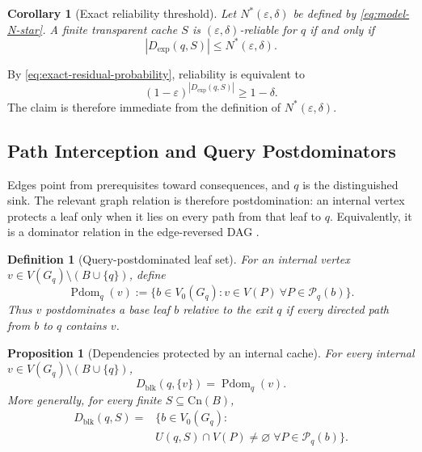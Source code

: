 \documentclass[journal]{IEEEtran}
\makeatletter
\newcommand{\Cn}{\text{Cn}}
\newtheorem{proposition}{Proposition}[section]
\newtheorem{corollary}{Corollary}[section]
\newtheorem{definition}{Definition}[section]
\numberwithin{equation}{section}
\renewenvironment{proof}[1][\proofname]{\par
  \pushQED{\qed}%
  \normalfont \topsep6\p@\@plus6\p@\relax
  \trivlist
  \item[\hskip\labelsep
        \itshape
    #1\@addpunct{.}]\ignorespaces
}{%
  \popQED\endtrivlist\@endpefalse
}
\makeatother
\begin{document}
\begin{corollary}[Exact reliability threshold]
\label{cor:exact-reliability-threshold}
Let \(N^*(\varepsilon,\delta)\) be defined by
\eqref{eq:model-N-star}.  A finite transparent cache \(S\) is
\((\varepsilon,\delta)\)-reliable for \(q\) if and only if
\begin{equation}
  |D_{\mathrm{exp}}(q,S)|
  \le
  N^*(\varepsilon,\delta).
\label{eq:exact-reliability-threshold}
\end{equation}
\end{corollary}

\begin{proof}
By \eqref{eq:exact-residual-probability}, reliability is equivalent to
\[
  (1-\varepsilon)^{|D_{\mathrm{exp}}(q,S)|}\ge 1-\delta.
\]
The claim is therefore immediate from the definition of
\(N^*(\varepsilon,\delta)\).
\end{proof}

\subsection{Path Interception and Query Postdominators}
\label{subsec:postdominator-interpretation}

Edges point from prerequisites toward consequences, and \(q\) is the
distinguished sink.  The relevant graph relation is therefore postdomination:
an internal vertex protects a leaf only when it lies on every path from that
leaf to \(q\).  Equivalently, it is a dominator relation in the
edge-reversed DAG \cite{lengauer1979fast}.

\begin{definition}[Query-postdominated leaf set]
\label{def:query-postdominator}
For an internal vertex
\(v\in V(G_q)\setminus(B\cup\{q\})\), define
\begin{equation}
  \operatorname{Pdom}_q(v)
  \!:=\!
  \bigl\{
    b\in V_0(G_q):
    v\in V(P)\ \forall P\in\mathcal P_q(b)
  \bigr\}.
\label{eq:def-query-postdominator}
\end{equation}
Thus \(v\) postdominates a base leaf \(b\) relative to the exit \(q\) if every
directed path from \(b\) to \(q\) contains \(v\).
\end{definition}

\begin{proposition}[Dependencies protected by an internal cache]
\label{prop:postdominator-protection}
For every internal
\(v\in V(G_q)\setminus(B\cup\{q\})\),
\begin{equation}
  D_{\mathrm{blk}}(q,\{v\})
  =
  \operatorname{Pdom}_q(v).
\label{eq:single-vertex-postdominator}
\end{equation}
More generally, for every finite \(S\subseteq\Cn(B)\),
\begin{equation}
  \begin{split}
    D_{\mathrm{blk}}(q,S)
    =
    &\bigl\{ b\in V_0(G_q) : \\
    & U(q,S)\cap V(P)\neq\varnothing \;\forall P\in\mathcal P_q(b) \bigr\}.
  \end{split}
\label{eq:set-path-interception}
\end{equation}
\end{proposition}
\end{document}
